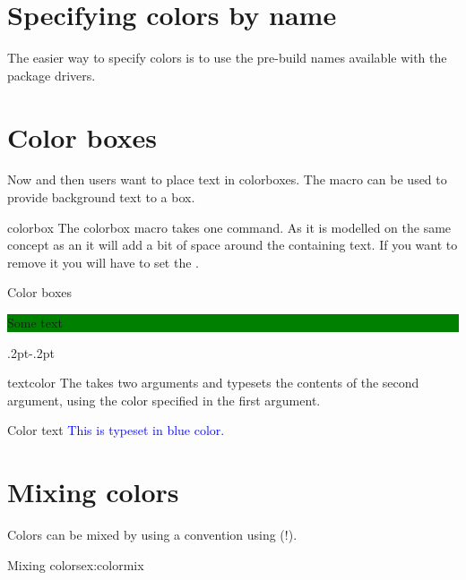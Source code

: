 \section{Specifying colors by name}

The easier way to specify colors is to use the pre-build names available
with the package drivers.


\section{Color boxes}

Now and then users want to place text in colorboxes. The macro  can be used to provide background text to a box.

\begin{docCommand}{colorbox}{}
The colorbox macro takes one command. As it is modelled on the same concept as an
 it will add a bit of space around the containing text. If you want
to remove it you will have to set the .
\end{docCommand}


\begin{texexample}{Color boxes}{}
\colorbox{green}{\begin{minipage}{3cm}
  Some text
\end{minipage}}

\fboxrule.2pt\fboxsep-.2pt
\end{texexample}

\begin{docCommand}{textcolor}{}
The  takes two arguments and typesets the contents of the second argument, using the color specified in the first argument.
\end{docCommand}

\begin{texexample}{Color text}{}
\textcolor{blue}{This is typeset in blue color.}

\end{texexample}

\section{Mixing colors}

Colors can be mixed by using a convention using (!).

\begin{texexample}{Mixing colors}{ex:colormix}
\color{blue!40!yellow}
\lorem 
\end{texexample}

